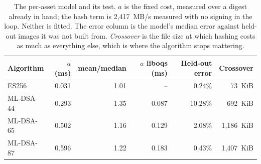\begin{table}[t]
\caption{The per-asset model and its test. $a$ is the fixed cost, measured over a digest already in hand; the hash term is 2,417~MB/s measured with no signing in the loop. Neither is fitted. The error column is the model's median error against held-out images it was not built from. \emph{Crossover} is the file size at which hashing costs as much as everything else, which is where the algorithm stops mattering.}
\label{tab:archivemodel}
\begin{tabular}{lrrrrr}
\toprule
Algorithm & $a$ (ms) & mean/median & $a$ liboqs (ms) & Held-out error & Crossover\\
\midrule
ES256 & 0.031 & 1.01 & -- & 0.24\% & 73~KiB\\
ML-DSA-44 & 0.293 & 1.35 & 0.087 & 10.28\% & 692~KiB\\
ML-DSA-65 & 0.502 & 1.16 & 0.129 & 2.08\% & 1,186~KiB\\
ML-DSA-87 & 0.596 & 1.22 & 0.183 & 0.43\% & 1,407~KiB\\
\bottomrule
\end{tabular}
\end{table}
